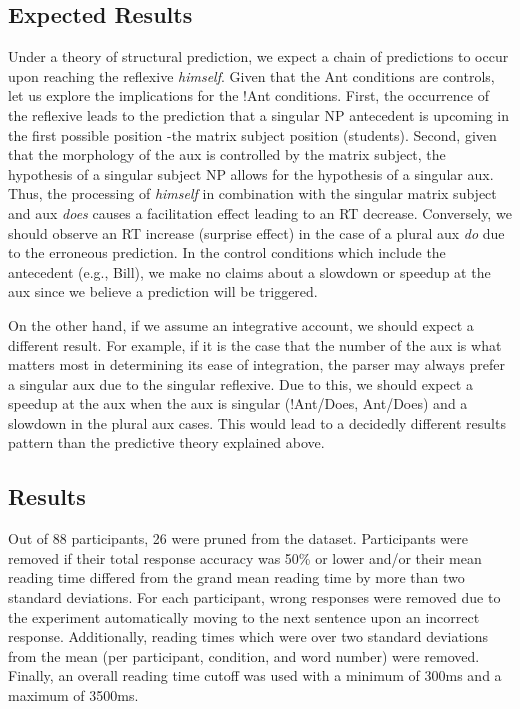 \documentclass[12pt]{article}
\begin{document}
\subsection{Expected Results}
Under a theory of structural prediction, we expect a chain of predictions to occur upon reaching the reflexive \textit{himself}. Given that the Ant conditions are controls, let us explore the implications for the !Ant conditions. First, the occurrence of the reflexive leads to the prediction that a singular NP antecedent is upcoming in the first possible position -the matrix subject position (students). Second, given that the morphology of the aux is controlled by the matrix subject, the hypothesis of a singular subject NP allows for the hypothesis of a singular aux. Thus, the processing of \textit{himself} in combination with the singular matrix subject and aux \textit{does} causes a facilitation effect leading to an RT decrease. Conversely, we should observe an RT increase (surprise effect) in the case of a plural aux \textit{do} due to the erroneous prediction. In the control conditions which include the antecedent (e.g., Bill), we make no claims about a slowdown or speedup at the aux since we believe a prediction will be triggered.

On the other hand, if we assume an integrative account, we should expect a different result. For example, if it is the case that the number of the aux is what matters most in determining its ease of integration, the parser may always prefer a singular aux due to the singular reflexive. Due to this, we should expect a speedup at the aux when the aux is singular (!Ant/Does, Ant/Does) and a slowdown in the plural aux cases. This would lead to a decidedly different results pattern than the predictive theory explained above.

\subsection{Results}
Out of 88 participants, 26 were pruned from the dataset. Participants were removed if their total response accuracy was 50\% or lower and/or their mean reading time differed from the grand mean reading time by
more than two standard deviations. For each participant, wrong responses were removed due to the experiment
automatically moving to the next sentence upon an incorrect response. Additionally, reading times which were over two standard deviations from the mean (per participant, condition, and word number) were removed. Finally, an overall
reading time cutoff was used with a minimum of 300ms and a maximum of 3500ms.
\end{document}
